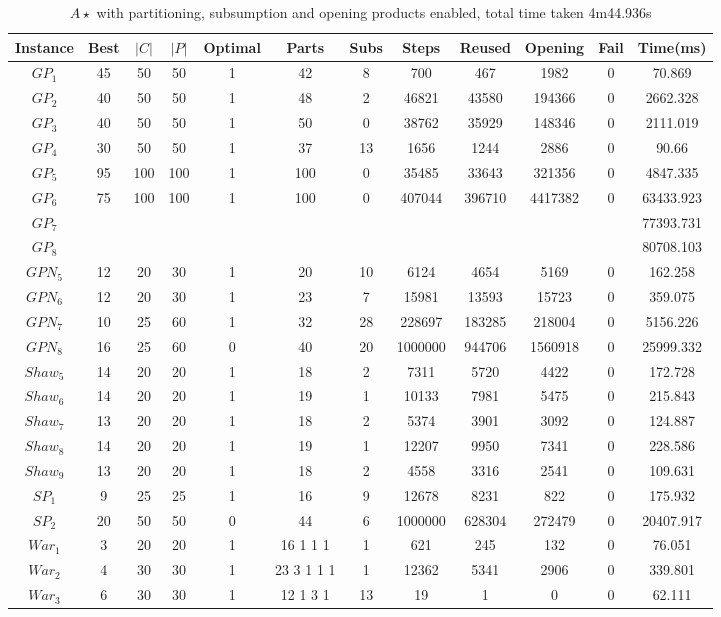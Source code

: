 \begin{table}[H]
\begin{tabular}{|c|c|c|c|c|c|c|c|c|c|c|c|} \hline
Instance&Best&$|C|$&$|P|$&Optimal&Parts&Subs&Steps&Reused&Opening&Fail&Time(ms) \\\hline
$GP_1$&45&50&50&1&42 &8&700&467&1982&0&70.869\\ 
$GP_2$&40&50&50&1&48 &2&46821&43580&194366&0&2662.328\\ 
$GP_3$&40&50&50&1&50 &0&38762&35929&148346&0&2111.019\\ 
$GP_4$&30&50&50&1&37 &13&1656&1244&2886&0&90.66\\ 
$GP_5$&95&100&100&1&100 &0&35485&33643&321356&0&4847.335\\ 
$GP_6$&75&100&100&1&100 &0&407044&396710&4417382&0&63433.923\\ 
$GP_7$&&&&&&&&&&&77393.731\\ 
$GP_8$&&&&&&&&&&&80708.103\\ 
$GPN_5$&12&20&30&1&20 &10&6124&4654&5169&0&162.258\\ 
$GPN_6$&12&20&30&1&23 &7&15981&13593&15723&0&359.075\\ 
$GPN_7$&10&25&60&1&32 &28&228697&183285&218004&0&5156.226\\ 
$GPN_8$&16&25&60&0&40 &20&1000000&944706&1560918&0&25999.332\\ 
$Shaw_5$&14&20&20&1&18 &2&7311&5720&4422&0&172.728\\ 
$Shaw_6$&14&20&20&1&19 &1&10133&7981&5475&0&215.843\\ 
$Shaw_7$&13&20&20&1&18 &2&5374&3901&3092&0&124.887\\ 
$Shaw_8$&14&20&20&1&19 &1&12207&9950&7341&0&228.586\\ 
$Shaw_9$&13&20&20&1&18 &2&4558&3316&2541&0&109.631\\ 
$SP_1$&9&25&25&1&16 &9&12678&8231&822&0&175.932\\ 
$SP_2$&20&50&50&0&44 &6&1000000&628304&272479&0&20407.917\\ 
$War_1$&3&20&20&1&16 1 1 1 &1&621&245&132&0&76.051\\ 
$War_2$&4&30&30&1&23 3 1 1 1 &1&12362&5341&2906&0&339.801\\ 
$War_3$&6&30&30&1&12 1 3 1 &13&19&1&0&0&62.111\\ 
\hline
\end{tabular} \caption{ $A\star$ with partitioning, subsumption and opening
products enabled, total time taken 4m44.936s} \end{table}



